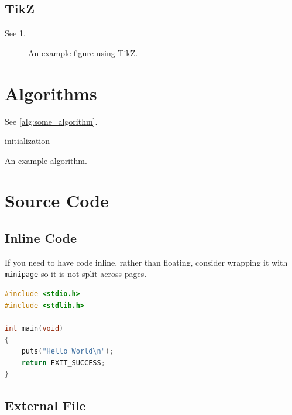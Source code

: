 \subsection{TikZ}

See \cref{fig:tikz_figure}.

\begin{figure}
	\centering
	
	\caption{An example figure using TikZ.}
	\label{fig:tikz_figure}
\end{figure}

\section{Algorithms}

See \cref{alg:some_algorithm}.

\begin{algorithm}
	\capstart
	\BlankLine
	initialization\;
	\caption{An example algorithm.}
	\label{alg:some_algorithm}
\end{algorithm}

\section{Source Code}

\subsection{Inline Code}

If you need to have code inline, rather than floating, consider wrapping it with \texttt{minipage} so it is not split across pages.

\begin{minipage}{0.95\textwidth}
\begin{lstlisting}[language=c]
#include <stdio.h>
#include <stdlib.h>

int main(void)
{
	puts("Hello World\n");
	return EXIT_SUCCESS;
}
\end{lstlisting}
\end{minipage}

\subsection{External File}

\begin{minipage}{0.95\textwidth}

\end{minipage}

